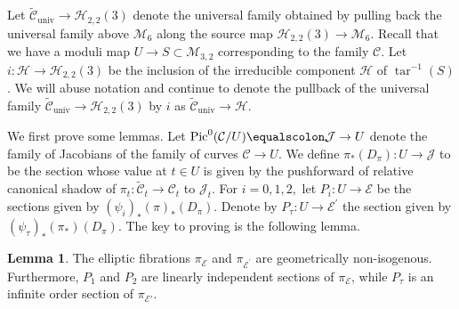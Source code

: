 \documentclass[reqno,10pt]{amsart}
\theoremstyle{definition}
\theoremstyle{definition}
\newtheorem{lem}[thm]{Lemma}
\DeclareMathOperator{\univ}{univ}
\DeclareMathOperator{\Pic}{Pic}
\DeclareMathOperator{\tar}{tar}
\begin{document}
Let $ \mathcal{\widetilde{\mathcal{C}}}_{\univ} \rightarrow \mathcal{H}_{2,2}(3)$ denote the universal family obtained by pulling back the universal family above $\mathcal{M}_6$ along the source map $\mathcal{H}_{2,2}(3) \rightarrow \mathcal{M}_6$. Recall that we have a moduli map $U \rightarrow S \subset \mathcal{M}_{3,2}$ corresponding to the family $\mathcal{C}$. Let $i \colon \mathcal{H} \rightarrow \mathcal{H}_{2,2}(3)$ be the inclusion of the irreducible component $\mathcal{H}$ of $\tar^{-1}(S)$. We will abuse notation and continue to denote the pullback of the universal family $\widetilde{\mathcal{C}}_{\univ} \rightarrow \mathcal{H}_{2,2}(3)$ by $i$ as $\widetilde{\mathcal{C}}_{\univ} \rightarrow \mathcal{H}$.

\renewcommand{\thmcermmpream}{Let $\mathcal{C}, A, A'$ be as above.  Let $ \widetilde{\mathcal{C}} \rightarrow U$ be the family of genus $6$ curves obtained by pulling back the composition $\widetilde{\mathcal{C}}_{\univ} \rightarrow \mathcal{H} \rightarrow S$ along the moduli map $U \rightarrow S$. }

\TCerMMone*


We first prove some lemmas. Let $\Pic^0(\mathcal{C}/U) \equalscolon \mathcal{J} \rightarrow U$ denote the  family of Jacobians of the family of curves $\mathcal{C} \rightarrow U$. We define $\pi_{*}(D_{\pi}) \colon U\rightarrow \mathcal{J}$ to be the section whose value at $t \in U$ is given by the pushforward of relative canonical shadow of $\pi_t \colon \widetilde{\mathcal{C}}_t\rightarrow \mathcal{C}_t$ to $\mathcal{J}_t$. For $i=0,1,2,$ let $P_i \colon U\rightarrow \mathcal{E}$ be the sections given by $(\psi_i)_*(\pi)_{*}(D_{\pi})$. Denote by $P_\tau \colon U\rightarrow \mathcal{E}^{\prime}$ the section given by $(\psi_\tau)_*(\pi_{*})(D_{\pi})$. The key to proving  is the following lemma.  
\begin{lem}\label{lem:sectionsindependent}
The elliptic fibrations $\pi_{\mathcal{E}}$ and $\pi_{\mathcal{E}^{\prime}}$ are geometrically non-isogenous. Furthermore, $P_1$ and $P_2$ are linearly independent sections of $\pi_{\mathcal{E}}$, while  $P_{\tau}$ is an  infinite order section of $\pi_{\mathcal{E}'}$.
\end{lem}
\end{document}
